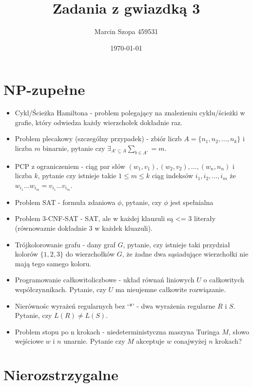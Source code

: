 \documentclass{article}
\title{Zadania z gwiazdką 3}
\author{Marcin Szopa 459531}
\date{\today}
\theoremstyle{definition}
\theoremstyle{remark}
\begin{document}
\section{NP-zupełne}

\begin{itemize}
    \item Cykl/Ścieżka Hamiltona - problem polegający na znalezieniu cyklu/ścieżki w grafie, który odwiedza każdy wierzchołek dokładnie raz.
    \item Problem plecakowy (szczególny przypadek) - zbiór liczb $A=\{n_1,n_2,\ldots,n_k\}$ i liczba $m$ binarnie, pytanie czy $\exists_{A' \subseteq A} \sum_{b \in A'}= m$.
    \item PCP z ograniczeniem - ciąg par słów $(w_1, v_1), (w_2, v_2), \ldots, (w_n, n_n)$ i liczba $k$,
     pytanie czy istnieje takie $1 \leq m \leq k$ ciąg indeksów $i_1, i_2, \ldots, i_m$ że $ w_{i_1} \ldots w_{i_m} = v_{i_1} \ldots v_{i_m}$.
    \item Problem SAT - formuła zdaniowa $\phi$, pytanie, czy $\phi$ jest spełnialna
    \item Problem 3-CNF-SAT - SAT, ale w każdej klauzuli są <= 3 literały (równowaznie dokładnie 3 w każdek kluazuli).
    \item Trójkolorowanie grafu - dany graf $G$, pytanie, czy istnieje taki przydział kolorów $\{1,2,3\}$ do wierzchołków $G$, że żadne dwa sąsiadujące wierzchołki nie mają tego samego koloru.
    \item Programowanie całkowitoliczbowe - układ równań liniowych $U$ o całkowitych współczynnikach. Pytanie, czy $U$ ma nieujemne całkowite rozwiązanie.
    \item Nierównośc wyrażeń regularnych bez `*' - dwa wyrażenia regularne $R$ i $S$. Pytanie, czy $L(R) \neq L(S)$.
    \item Problem stopu po n krokach - niedeterministyczna maszyna Turinga $M$, słowo wejściowe $w$ i $n$ unarnie. Pytanie czy $M$ akceptuje $w$ conajwyżej $n$ krokach?
\end{itemize}

\section {Nierozstrzygalne}
\end{document}
